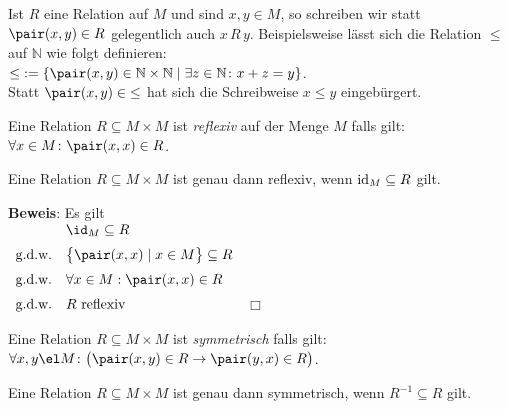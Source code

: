 Ist $R$ eine Relation auf $M$ und sind $x, y \in M$, so schreiben wir statt
$\pair(x,y) \in R$ gelegentlich auch $x\, R\, y$.  Beispielsweise l\"{a}sst sich die Relation $\leq$ 
auf $\mathbb{N}$ wie folgt definieren: \\[0.2cm]
\hspace*{1.3cm}
 $\leq\; := \{ \pair(x,y) \in \mathbb{N} \times \mathbb{N} \mid \exists z \in \mathbb{N} \colon x + z = y \}$.
\\[0.2cm]
Statt $\pair(x,y) \in\; \leq$ hat sich die Schreibweise $x \leq y$ eingeb\"{u}rgert.
  
\begin{Definition} 
Eine Relation $R \subseteq M \times M$  ist \emph{reflexiv} auf der Menge $M$ falls gilt: \\[0.2cm]
\hspace*{1.3cm} $\forall x\in M \colon \pair(x,x) \in R$. 
\end{Definition}

\begin{Satz}
Eine Relation $R \subseteq M \times M$ ist genau dann reflexiv, wenn $\mbox{\rm id}_M \subseteq R$ gilt.
\end{Satz}

\noindent
\textbf{Beweis}: Es gilt
\\[0.2cm]
\hspace*{1.3cm}
$
\begin{array}[b]{cl}
              & \id_M \subseteq R \\[0.2cm]
\mbox{g.d.w.} & \bigl\{ \pair(x,x) \mid x \in M \bigr\} \subseteq R \\[0.2cm] 
\mbox{g.d.w.} & \forall x \in M: \pair(x,x) \in R \\[0.2cm] 
\mbox{g.d.w.} & \mbox{$R$ reflexiv}  
\end{array}
$
\hspace*{\fill} $\Box$

\begin{Definition}
Eine Relation $R \subseteq M \times M$  ist \emph{symmetrisch} falls gilt: \\[0.2cm]
\hspace*{1.3cm} 
$\forall x,y\el M \colon \bigl(\pair(x,y) \in R \rightarrow\pair(y,x)\in R\bigr)$. 
\end{Definition}

\begin{Satz}
Eine Relation $R \subseteq M \times M$ ist genau dann symmetrisch, wenn $R^{-1} \subseteq R$ gilt.
\end{Satz}

